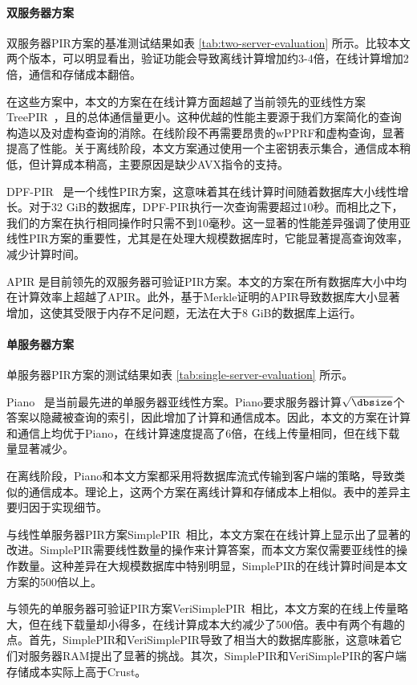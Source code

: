 \paragraph{双服务器方案}
双服务器PIR方案的基准测试结果如表 \ref{tab:two-server-evaluation} 所示。比较本文两个版本，可以明显看出，验证功能会导致离线计算增加约3-4倍，在线计算增加2倍，通信和存储成本翻倍。

在这些方案中，本文的方案在在线计算方面超越了当前领先的亚线性方案TreePIR~\cite{C:LazPap23}，且的总体通信量更小。这种优越的性能主要源于我们方案简化的查询构造以及对虚构查询的消除。在线阶段不再需要昂贵的wPPRF和虚构查询，显著提高了性能。关于离线阶段，本文方案通过使用一个主密钥表示集合，通信成本稍低，但计算成本稍高，主要原因是缺少AVX指令的支持。

DPF-PIR~\cite{EC:GilIsh14} 是一个线性PIR方案，这意味着其在线计算时间随着数据库大小线性增长。对于32 GiB的数据库，DPF-PIR执行一次查询需要超过10秒。而相比之下，我们的方案在执行相同操作时只需不到10毫秒。这一显著的性能差异强调了使用亚线性PIR方案的重要性，尤其是在处理大规模数据库时，它能显著提高查询效率，减少计算时间。

APIR \cite{APIR} 是目前领先的双服务器可验证PIR方案。本文的方案在所有数据库大小中均在计算效率上超越了APIR。此外，基于Merkle证明的APIR导致数据库大小显著增加，这使其受限于内存不足问题，无法在大于8 GiB的数据库上运行。

\paragraph{单服务器方案}
单服务器PIR方案的测试结果如表 \ref{tab:single-server-evaluation} 所示。

Piano~\cite{Piano} 是当前最先进的单服务器亚线性方案。Piano要求服务器计算$\sqrt{\dbsize}$个答案以隐藏被查询的索引，因此增加了计算和通信成本。因此，本文的方案在计算和通信上均优于Piano，在线计算速度提高了6倍，在线上传量相同，但在线下载量显著减少。

在离线阶段，Piano和本文方案都采用将数据库流式传输到客户端的策略，导致类似的通信成本。理论上，这两个方案在离线计算和存储成本上相似。表中的差异主要归因于实现细节。

与线性单服务器PIR方案SimplePIR~\cite{SimplePIR}相比，本文方案在在线计算上显示出了显著的改进。SimplePIR需要线性数量的操作来计算答案，而本文方案仅需要亚线性的操作数量。这种差异在大规模数据库中特别明显，SimplePIR的在线计算时间是本文方案的500倍以上。

与领先的单服务器可验证PIR方案VeriSimplePIR~\cite{VeriSimplePIR}相比，本文方案的在线上传量略大，但在线下载量却小得多，在线计算成本大约减少了500倍。表中有两个有趣的点。首先，SimplePIR和VeriSimplePIR导致了相当大的数据库膨胀，这意味着它们对服务器RAM提出了显著的挑战。其次，SimplePIR和VeriSimplePIR的客户端存储成本实际上高于Crust。

